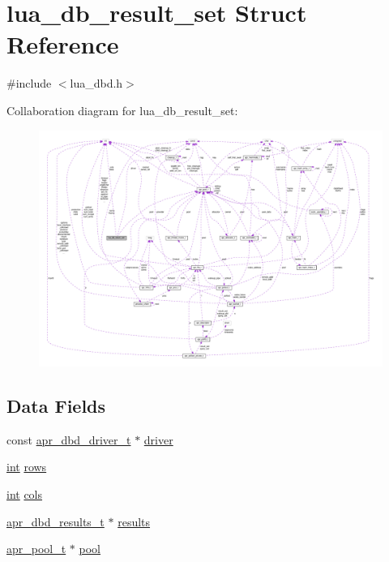 \hypertarget{structlua__db__result__set}{}\section{lua\+\_\+db\+\_\+result\+\_\+set Struct Reference}
\label{structlua__db__result__set}


{\ttfamily \#include $<$lua\+\_\+dbd.\+h$>$}



Collaboration diagram for lua\+\_\+db\+\_\+result\+\_\+set\+:
\nopagebreak
\begin{figure}[H]
\begin{center}
\leavevmode
\includegraphics[width=350pt]{structlua__db__result__set__coll__graph}
\end{center}
\end{figure}
\subsection*{Data Fields}
\begin{DoxyCompactItemize}
\item 
const \hyperlink{structapr__dbd__driver__t}{apr\+\_\+dbd\+\_\+driver\+\_\+t} $\ast$ \hyperlink{structlua__db__result__set_a1cc3e423226d7417726b1ad1359d56ba}{driver}
\item 
\hyperlink{pcre_8txt_a42dfa4ff673c82d8efe7144098fbc198}{int} \hyperlink{structlua__db__result__set_ac148b93b6d46bb3ec85b08a31b9ff943}{rows}
\item 
\hyperlink{pcre_8txt_a42dfa4ff673c82d8efe7144098fbc198}{int} \hyperlink{structlua__db__result__set_ac7cec3e26d666243ff37e16dcab7741c}{cols}
\item 
\hyperlink{group__APR__Util__DBD_ga6765891011818912e1b52fef773bfce6}{apr\+\_\+dbd\+\_\+results\+\_\+t} $\ast$ \hyperlink{structlua__db__result__set_a50834f059df4bede2b7f8ac193369f3c}{results}
\item 
\hyperlink{structapr__pool__t}{apr\+\_\+pool\+\_\+t} $\ast$ \hyperlink{structlua__db__result__set_a7c0855626d660e95ea027955e132f9c2}{pool}
\end{DoxyCompactItemize}


